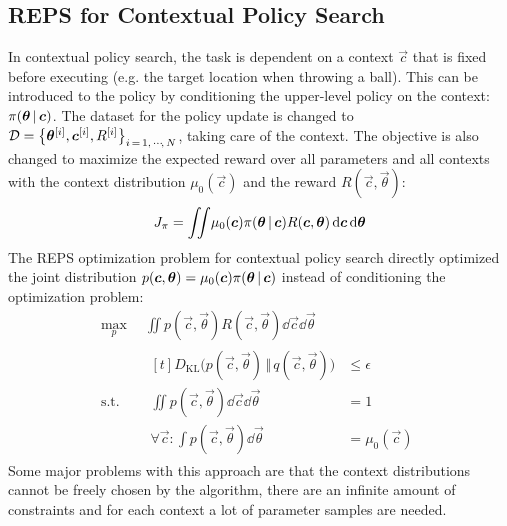 		\subsection{REPS for Contextual Policy Search}
			In contextual policy search, the task is dependent on a context \(\vec{c}\) that is fixed before executing (e.g. the target location when throwing a ball). This can be introduced to the policy by conditioning the upper-level policy on the context: \( \pi(\bm{\theta} \,\vert\, \bm{c}) \). The dataset for the policy update is changed to \( \mathcal{D} = \big\{ \bm{\theta}^{[i]}, \bm{c}^{[i]}, R^{[i]} \big\}_{i \,=\, 1,\,\cdots\!,\,N} \), taking care of the context. The objective is also changed to maximize the expected reward over all parameters and all contexts with the context distribution \( \mu_0(\vec{c}) \) and the reward \( R(\vec{c}, \vec{\theta}) \):
			\begin{equation*}
				J_\pi = \iint\! \mu_0(\bm{c}) \pi(\bm{\theta} \,\vert\, \bm{c}) R(\bm{c}, \bm{\theta}) \dd{\bm{c}} \dd{\bm{\theta}}
			\end{equation*}
			The REPS optimization problem for contextual policy search directly optimized the joint distribution \( p(\bm{c}, \bm{\theta}) = \mu_0(\bm{c}) \pi(\bm{\theta} \,\vert\, \bm{c}) \) instead of conditioning the optimization problem:
			\begin{equation*}
				\begin{aligned}
					\max_p \,& \iint\! p(\vec{c}, \vec{\theta}) R(\vec{c}, \vec{\theta}) \dd{\vec{c}} \dd{\vec{\theta}} \\
					\mathrm{s.t.} \quad&
						\begin{aligned}[t]
							D_\mathrm{KL}\big( p(\vec{c}, \vec{\theta}) \,\Vert\, q(\vec{c}, \vec{\theta}) \big) &\leq \epsilon \\
							\iint\! p(\vec{c}, \vec{\theta}) \dd{\vec{c}} \dd{\vec{\theta}} &= 1 \\
							\forall \vec{c} : \int\! p(\vec{c}, \vec{\theta}) \dd{\vec{\theta}} &= \mu_0(\vec{c})
						\end{aligned}
				\end{aligned}
			\end{equation*}
			Some major problems with this approach are that the context distributions cannot be freely chosen by the algorithm, there are an infinite amount of constraints and for each context a lot of parameter samples are needed.

